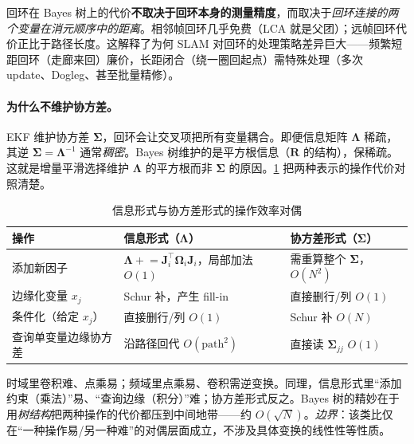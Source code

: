 \begin{insight}
回环在 Bayes 树上的代价\textbf{不取决于回环本身的测量精度}，而取决于\emph{回环连接的两个变量在消元顺序中的距离}。相邻帧回环几乎免费（LCA 就是父团）；远帧回环代价正比于路径长度。这解释了为何 SLAM 对回环的处理策略差异巨大——频繁短距回环（走廊来回）廉价，长距闭合（绕一圈回起点）需特殊处理（多次 update、Dogleg、甚至批量精修）。
\end{insight}

\paragraph{为什么不维护协方差。}
EKF 维护协方差 $\boldsymbol{\Sigma}$，回环会让交叉项把所有变量耦合。即便信息矩阵 $\boldsymbol{\Lambda}$ 稀疏，其逆 $\boldsymbol{\Sigma}=\boldsymbol{\Lambda}^{-1}$ 通常\emph{稠密}。Bayes 树维护的是平方根信息（$\mathbf{R}$ 的结构），保稀疏。这就是增量平滑选择维护 $\boldsymbol{\Lambda}$ 的平方根而非 $\boldsymbol{\Sigma}$ 的原因。\cref{tab:dual-form} 把两种表示的操作代价对照清楚。

\begin{table}[H]\centering\small
\caption{信息形式与协方差形式的操作效率对偶}
\label{tab:dual-form}
\begin{tabular}{lll}
\toprule
操作 & 信息形式（$\boldsymbol{\Lambda}$） & 协方差形式（$\boldsymbol{\Sigma}$） \\
\midrule
添加新因子 & $\boldsymbol{\Lambda}\mathrel{+}=\mathbf{J}_i^\top\boldsymbol{\Omega}_i\mathbf{J}_i$，局部加法 $O(1)$ & 需重算整个 $\boldsymbol{\Sigma}$，$O(N^2)$ \\
边缘化变量 $x_j$ & Schur 补，产生 fill-in & 直接删行/列 $O(1)$ \\
条件化（给定 $x_j$） & 直接删行/列 $O(1)$ & Schur 补 $O(N)$ \\
查询单变量边缘协方差 & 沿路径回代 $O(\text{path}^2)$ & 直接读 $\boldsymbol{\Sigma}_{jj}$ $O(1)$ \\
\bottomrule
\end{tabular}
\end{table}

\begin{insight}
时域里卷积难、点乘易；频域里点乘易、卷积需逆变换。同理，信息形式里“添加约束（乘法）”易、“查询边缘（积分）”难；协方差形式反之。Bayes 树的精妙在于用\emph{树结构}把两种操作的代价都压到中间地带——约 $O(\sqrt N)$。\emph{边界}：该类比仅在“一种操作易/另一种难”的对偶层面成立，不涉及具体变换的线性性等性质。
\end{insight}

